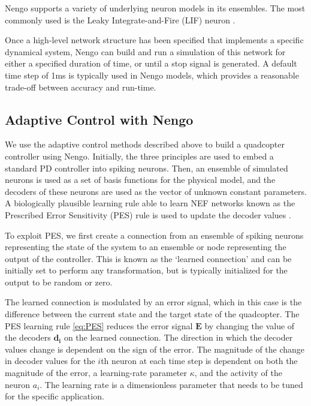\documentclass[letterpaper, 10 pt, conference]{ieeeconf}  %
\begin{document}
Nengo supports a variety of underlying neuron models in its ensembles.
The most commonly used is the Leaky Integrate-and-Fire (LIF) neuron \cite{burkitt2006review}.

Once a high-level network structure has been specified that implements a specific dynamical system, Nengo can build and run a simulation of this network for either a specified duration of time, or until a stop signal is generated. 
A default time step of 1ms is typically used in Nengo models, which provides a reasonable trade-off between accuracy and run-time.

\subsection{Adaptive Control with Nengo}

We use the adaptive control methods described above to build a quadcopter controller using Nengo.
Initially, the three principles are used to embed a standard PD controller into spiking neurons.
Then, an ensemble of simulated neurons is used as a set of basis functions for the physical model, and the decoders of these neurons are used as the vector of unknown constant parameters.
A biologically plausible learning rule able to learn NEF networks known as the Prescribed Error Sensitivity (PES) rule is used to update the decoder values \cite{bekolay2013simultaneous}. 

To exploit PES, we first create a connection from an ensemble of spiking neurons representing the state of the system to an ensemble or node representing the output of the controller. 
This is known as the `learned connection' and can be initially set to perform any transformation, but is typically initialized for the output to be random or zero.

The learned connection is modulated by an error signal, which in this case is the difference between the current state and the target state of the quadcopter.
The PES learning rule \eqref{eq:PES} reduces the error signal $\bm{E}$ by changing the value of the decoders $\bm{d_{i}}$ on the learned connection. 
The direction in which the decoder values change is dependent on the sign of the error. 
The magnitude of the change in decoder values for the $i$th neuron at each time step is dependent on both the magnitude of the error, a learning-rate parameter $\kappa$, and the activity of the neuron $a_{i}$. 
The learning rate is a dimensionless parameter that needs to be tuned for the specific application. 
\end{document}
